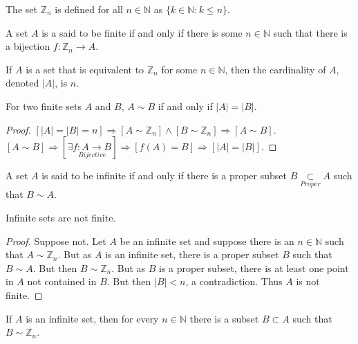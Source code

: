 \documentclass[crop=false,class=book,oneside]{standalone}
\begin{document}
            \begin{definition}
            The set $\mathbb{Z}_n$ is defined for all $n\in \mathbb{N}$ as $\{k\in \mathbb{N}: k\leq n\}$.
            \end{definition}
            \begin{definition}
            A set $A$ is a said to be finite if and only if there is some $n\in \mathbb{N}$ such that there is a bijection $f:\mathbb{Z}_n \rightarrow A$.
            \end{definition}
            \begin{definition}
            If $A$ is a set that is equivalent to $\mathbb{Z}_n$ for some $n\in \mathbb{N}$, then the cardinality of $A$, denoted $|A|$, is $n$.
            \end{definition}
            \begin{theorem}
            For two finite sets $A$ and $B$, $A\sim B$ if and only if $|A|=|B|$.
            \end{theorem}
            \begin{proof}
            $[|A|=|B|=n]\Rightarrow[A\sim \mathbb{Z}_n]\land[B\sim \mathbb{Z}_n]\Rightarrow [A\sim B]$. $[A\sim B]\Rightarrow [\exists \underset{Bijective}{f:A\rightarrow B}]\Rightarrow [f(A) = B]\Rightarrow [|A|=|B|]$.
            \end{proof}
            \begin{definition}
            A set $A$ is said to be infinite if and only if there is a proper subset $B\underset{Proper}\subset A$ such that $B\sim A$.
            \end{definition}
            \begin{theorem}
            Infinite sets are not finite.
            \end{theorem}
            \begin{proof}
            Suppose not. Let $A$ be an infinite set and suppose there is an $n\in \mathbb{N}$ such that $A\sim \mathbb{Z}_n$. But as $A$ is an infinite set, there is a proper subset $B$ such that $B\sim A$. But then $B\sim \mathbb{Z}_n$. But as $B$ is a proper subset, there is at least one point in $A$ not contained in $B$. But then $|B|<n$, a contradiction. Thus $A$ is not finite.
            \end{proof}
            \begin{corollary}
            If $A$ is an infinite set, then for every $n\in \mathbb{N}$ there is a subset $B\subset A$ such that $B\sim \mathbb{Z}_n$.
            \end{corollary}
\end{document}
